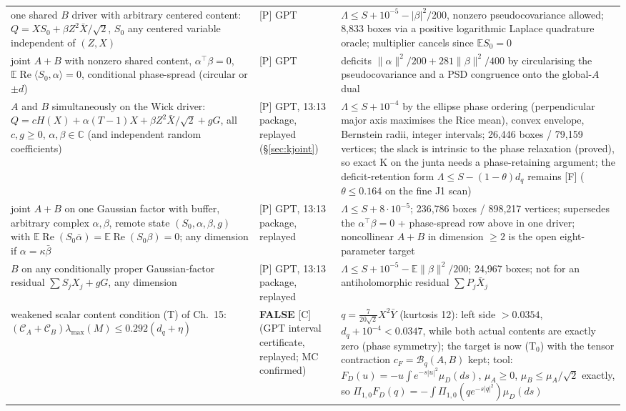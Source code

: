 \documentclass[11pt,a4paper]{article}
\newcommand{\C}{\mathbb{C}}\newcommand{\R}{\mathbb{R}}\newcommand{\E}{\mathbb{E}}\newcommand{\Hc}[2]{H_{#1,#2}}
\renewcommand{\Re}{\operatorname{Re}}\newcommand{\Var}{\operatorname{Var}}\newcommand{\ph}{\operatorname{phase}}\newcommand{\st}[1]{\textsf{[#1]}}\newcommand{\brkus}{\textunderscore\allowbreak}\usepackage{xstring,adjustbox}\DeclareRobustCommand{\code}[1]{\begingroup\noexpandarg\StrSubstitute{#1}{/}{/\allowbreak}[\brktmp]\texttt{\let\_\brkus\hyphenchar\font=`\-\brktmp}\endgroup}\setlength{\emergencystretch}{3em}
\begin{document}
\begin{center}
\begin{tabular}{p{4.6cm}p{2.2cm}p{8.4cm}}
one shared $B$ driver with arbitrary centered content: $Q=XS_0+\beta Z^2\bar X/\sqrt2$, $S_0$ any centered variable independent of $(Z,X)$ & \st{P} GPT & $\Lambda\le S+10^{-5}-|\beta|^2/200$, nonzero pseudocovariance allowed; 8,833 boxes via a positive logarithmic Laplace quadrature oracle; multiplier cancels since $\E S_0=0$\\
joint $A+B$ with nonzero shared content, $\alpha^{\top}\beta=0$, $\E\Re\langle S_0,\alpha\rangle=0$, conditional phase-spread (circular or $\pm d$) & \st{P} GPT & deficits $\|\alpha\|^2/200+281\|\beta\|^2/400$ by circularising the pseudocovariance and a PSD congruence onto the global-$A$ dual\\
$A$ and $B$ simultaneously on the Wick driver: $Q=cH(X)+\alpha(T-1)X+\beta Z^2\bar X/\sqrt2+gG$, all $c,g\ge0$, $\alpha,\beta\in\C$ (and independent random coefficients) & \st{P} GPT, 13:13 package, replayed (\S\ref{sec:kjoint}) & $\Lambda\le S+10^{-4}$ by the ellipse phase ordering (perpendicular major axis maximises the Rice mean), convex envelope, Bernstein radii, integer intervals; 26,446 boxes / 79,159 vertices; the slack is intrinsic to the phase relaxation (proved), so exact K on the junta needs a phase-retaining argument; the deficit-retention form $\Lambda\le S-(1-\theta)d_q$ remains \st{F} ($\theta\le0.164$ on the fine J1 scan)\\
joint $A{+}B$ on one Gaussian factor with buffer, arbitrary complex $\alpha,\beta$, remote state $(S_0,\alpha,\beta,g)$ with $\E\Re(S_0\bar\alpha)=\E\Re(S_0\beta)=0$; any dimension if $\alpha=\kappa\bar\beta$ & \st{P} GPT, 13:13 package, replayed & $\Lambda\le S+8\cdot10^{-5}$; 236,786 boxes / 898,217 vertices; supersedes the $\alpha^{\top}\beta=0$ + phase-spread row above in one driver; noncollinear $A{+}B$ in dimension $\ge2$ is the open eight-parameter target\\
$B$ on any conditionally proper Gaussian-factor residual $\sum S_jX_j+gG$, any dimension & \st{P} GPT, 13:13 package, replayed & $\Lambda\le S+10^{-5}-\E\|\beta\|^2/200$; 24,967 boxes; not for an antiholomorphic residual $\sum P_j\bar X_j$\\
weakened scalar content condition (T) of Ch.~15: $(\mathcal C_A+\mathcal C_B)\lambda_{\max}(M)\le0.292(d_q+\eta)$ & \textbf{FALSE} \st{C} (GPT interval certificate, replayed; MC confirmed) & $q=\frac7{20\sqrt2}X^2\bar Y$ (kurtosis 12): left side $>0.0354$, $d_q+10^{-4}<0.0347$, while both actual contents are exactly zero (phase symmetry); the target is now (T$_0$) with the tensor contraction $c_F=\mathcal B_q(A,B)$ kept; tool: $F_D(u)=-u\int e^{-s|u|^2}\mu_D(ds)$, $\mu_A\ge0$, $\mu_B\le\mu_A/\sqrt2$ exactly, so $\Pi_{1,0}F_D(q)=-\int\Pi_{1,0}(qe^{-s|q|^2})\mu_D(ds)$\\

\end{tabular}
\end{center}
\end{document}
